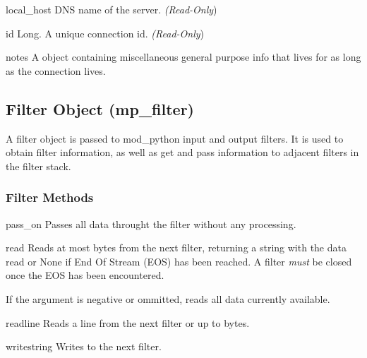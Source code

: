 \begin{memberdesc}[connection]{local_host}
  DNS name of the server.
  \emph{(Read-Only})
\end{memberdesc}

\begin{memberdesc}[connection]{id}
  Long. A unique connection id.
  \emph{(Read-Only})
\end{memberdesc}

\begin{memberdesc}[connection]{notes}
  A  object containing miscellaneous general purpose info that lives for
  as long as the connection lives. 
\end{memberdesc}

\subsection{Filter Object (mp_filter)\label{pyapi-mpfilt}}

A filter object is passed to mod_python input and output filters. It
is used to obtain filter information, as well as get and pass
information to adjacent filters in the filter stack.

\subsubsection{Filter Methods\label{pyapi-mpfilt-meth}}

\begin{methoddesc}[filter]{pass_on}{}
  Passes all data throught the filter without any processing.
\end{methoddesc}

\begin{methoddesc}[filter]{read}{}
  Reads at most  bytes from the next filter, returning a string
  with the data read or None if End Of Stream (EOS) has been reached. A
  filter \emph{must} be closed once the EOS has been encountered.

  If the  argument is negative or ommitted, reads all data
  currently available.
\end{methoddesc}

\begin{methoddesc}[filter]{readline}{}
  Reads a line from the next filter or up to  bytes.
\end{methoddesc}

\begin{methoddesc}[filter]{write}{string}
  Writes  to the next filter.
\end{methoddesc}

